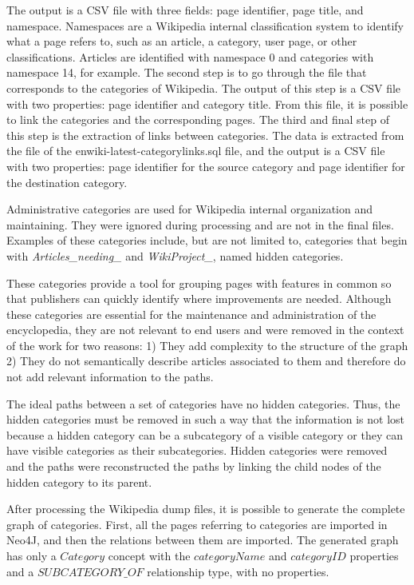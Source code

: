 The output is a CSV file with three fields: page identifier, page title, and namespace. Namespaces are a Wikipedia internal classification system to identify what a page refers to, such as an article, a category, user page, or other classifications. Articles are identified with namespace 0 and categories with namespace 14, for example.
The second step is to go through the file that corresponds to the categories of Wikipedia. The output of this step is a CSV file with two properties: page identifier and category title. From this file, it is possible to link the categories and the corresponding pages. The third and final step of this step is the extraction of links between categories. The data is extracted from the file of the enwiki-latest-categorylinks.sql file, and the output is a CSV file with two properties: page identifier for the source category and page identifier for the destination category.

Administrative categories are used for Wikipedia internal organization and maintaining. They were ignored during processing and are not in the final files. Examples of these categories include, but are not limited to, categories that begin with \textit{Articles\_needing\_} and \textit{WikiProject\_}, named hidden categories.


These categories provide a tool for grouping pages with features in common so that publishers can quickly identify where improvements are needed. Although these categories are essential for the maintenance and administration of the encyclopedia, they are not relevant to end users and were removed in the context of the work for two reasons: 1) They add complexity to the structure of the graph 2) They do not semantically describe articles associated to them and therefore do not add relevant information to the paths.

The ideal paths between a set of categories have no hidden categories. Thus, the hidden categories must be removed in such a way that the information is not lost because a hidden category can be a subcategory of a visible category or they can have visible categories as their subcategories. Hidden categories were removed and the paths were reconstructed the paths by linking the child nodes of the hidden category to its parent. 

After processing the Wikipedia dump files, it is possible to generate the complete graph of categories. First, all the pages referring to categories are imported in Neo4J, and then the relations between them are imported. The generated graph has only a $Category$ concept with the $categoryName$ and $categoryID$ properties and a $SUBCATEGORY\_OF$ relationship type, with no properties.

